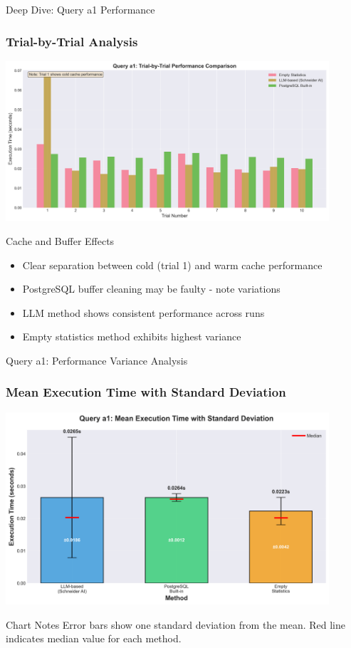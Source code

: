 \documentclass{beamer}
\begin{document}
\begin{frame}{Deep Dive: Query a1 Performance}
\frametitle{Trial-by-Trial Analysis}

\begin{center}
\includegraphics[width=0.9\textwidth]{images/a1_trial_comparison.png}
\end{center}

\begin{alertblock}{Cache and Buffer Effects}
\begin{itemize}
    \item Clear separation between cold (trial 1) and warm cache performance
    \item PostgreSQL buffer cleaning may be faulty - note variations
    \item LLM method shows consistent performance across runs
    \item Empty statistics method exhibits highest variance
\end{itemize}
\end{alertblock}

\end{frame}

\begin{frame}{Query a1: Performance Variance Analysis}
\frametitle{Mean Execution Time with Standard Deviation}

\begin{center}
\includegraphics[width=0.9\textwidth]{images/a1_execution_time_barplot.png}
\end{center}

\begin{alertblock}{Chart Notes}
Error bars show one standard deviation from the mean. Red line indicates median value for each method.
\end{alertblock}

\end{frame}
\end{document}
